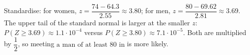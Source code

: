 Standardise: for women, $z=\dfrac{74-64.3}{2.55}\approx3.80$; for men, $z=\dfrac{80-69.62}{2.81}\approx3.69$. The upper tail of the standard normal is larger at the smaller $z$: $P(Z\ge3.69)\approx1.1\cdot10^{-4}$ versus $P(Z\ge3.80)\approx7.1\cdot10^{-5}$. Both are multiplied by $\dfrac12$, so meeting $\boxed{\text{a man of at least }80\text{ in}}$ is more likely.

